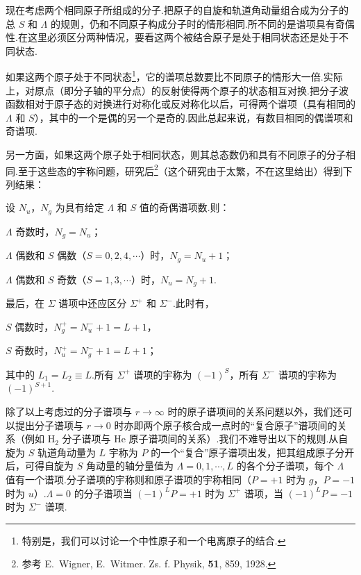 现在考虑两个相同原子所组成的分子.把原子的自旋和轨道角动量组合成为分子的总 $S$ 和 $\Lambda$ 的规则，仍和不同原子构成分子时的情形相同.所不同的是谱项具有奇偶性.在这里必须区分两种情况，要看这两个被结合原子是处于相同状态还是处于不同状态.

如果这两个原子处于不同状态\footnote{特别是，我们可以讨论一个中性原子和一个电离原子的结合.}，它的谱项总数要比不同原子的情形大一倍.实际上，对原点（即分子轴的平分点）的反射使得两个原子的状态相互对换.把分子波函数相对于原子态的对换进行对称化或反对称化以后，可得两个谱项（具有相同的 $\Lambda$ 和 $S$），其中的一个是偶的另一个是奇的.因此总起来说，有数目相同的偶谱项和奇谱项.

另一方面，如果这两个原子处于相同状态，则其总态数仍和具有不同原子的分子相同.至于这些态的宇称问题，研究后\footnote{参考 E.~Wigner, E.~Witmer. Zs. f. Physik, \textbf{51}, 859, 1928.}（这个研究由于太繁，不在这里给出）得到下列结果：

设 $N_u$，$N_g$ 为具有给定 $\Lambda$ 和 $S$ 值的奇偶谱项数.则：

$\Lambda$ 奇数时，$N_g=N_u$；

$\Lambda$ 偶数和 $S$ 偶数（$S=0,2,4,\cdots$）时，$N_g=N_u+1$；

$\Lambda$ 偶数和 $S$ 奇数（$S=1,3,\cdots$）时，$N_u=N_g+1$.

最后，在 $\Sigma$ 谱项中还应区分 $\Sigma^+$ 和 $\Sigma^-$.此时有，

$S$ 偶数时，$N_g^+=N_u^-+1=L+1$，

$S$ 奇数时，$N_u^+=N_g^-+1=L+1$；

其中的 $L_1=L_2\equiv L$.所有 $\Sigma^+$ 谱项的宇称为 $(-1)^S$，所有 $\Sigma^-$ 谱项的宇称为 $(-1)^{S+1}$.

除了以上考虑过的分子谱项与 $r\to\infty$ 时的原子谱项间的关系问题以外，我们还可以提出分子谱项与 $r\to0$ 时亦即两个原子核合成一点时的“复合原子”谱项间的关系（例如 $\mathrm{H}_2$ 分子谱项与 He 原子谱项间的关系）.我们不难导出以下的规则.从自旋为 $S$ 轨道角动量为 $L$ 宇称为 $P$ 的一个“复合”原子谱项出发，把其组成原子分开后，可得自旋为 $S$ 角动量的轴分量值为 $\Lambda=0,1,\cdots,L$ 的各个分子谱项，每个 $\Lambda$ 值有一个谱项.分子谱项的宇称则和原子谱项的宇称相同（$P=+1$ 时为 $g$，$P=-1$ 时为 $u$）.$\Lambda=0$ 的分子谱项当 $(-1)^LP=+1$ 时为 $\Sigma^+$ 谱项，当 $(-1)^LP=-1$ 时为 $\Sigma^-$ 谱项.

